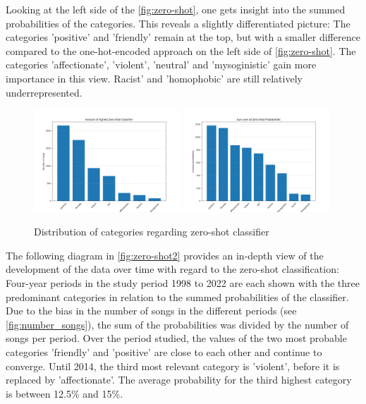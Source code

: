 Looking at the left side of the \autoref{fig:zero-shot}, one gets insight into the summed probabilities of the categories. This reveals a slightly differentiated picture: The categories 'positive' and 'friendly' remain at the top, but with a smaller difference compared to the one-hot-encoded approach on the left side of \autoref{fig:zero-shot}. The categories 'affectionate', 'violent', 'neutral' and 'mysoginistic' gain more importance in this view. Racist' and 'homophobic' are still relatively underrepresented.


\begin{figure}[!htb]
    \centering
    \includegraphics[width=0.49\textwidth]{figures/overall_score_binary_zero_shot.png}
    \includegraphics[width=0.49\textwidth]{figures/overall_score_zero_shot.png}
    \caption{Distribution of categories regarding zero-shot classifier}
    \label{fig:zero-shot}
\end{figure}

The following diagram in \autoref{fig:zero-shot2} provides an in-depth view of the development of the data over time with regard to the zero-shot classification: Four-year periods in the study period 1998 to 2022 are each shown with the three predominant categories in relation to the summed probabilities of the classifier. Due to the bias in the number of songs in the different periods (see \autoref{fig:number_songs}), the sum of the probabilities was divided by the number of songs per period. Over the period studied, the values of the two most probable categories 'friendly' and 'positive' are close to each other and continue to converge. Until 2014, the third most relevant category is 'violent', before it is replaced by 'affectionate'. The average probability for the third highest category is between 12.5\% and 15\%. 

